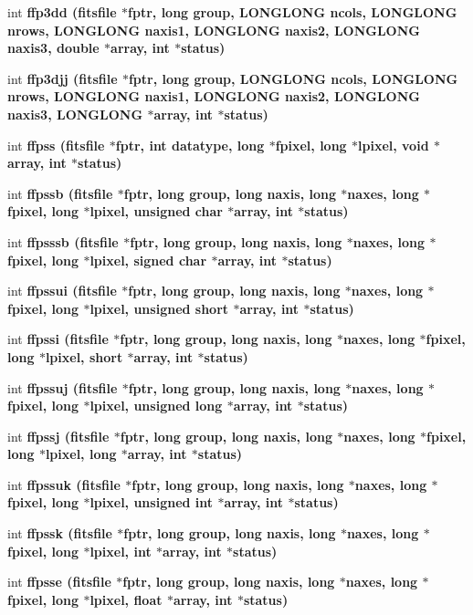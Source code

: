 \begin{CompactItemize}
\item 
int \bf{ffp3dd} (\bf{fitsfile} $\ast$fptr, long group, \bf{LONGLONG} ncols, \bf{LONGLONG} nrows, \bf{LONGLONG} naxis1, \bf{LONGLONG} naxis2, \bf{LONGLONG} naxis3, double $\ast$array, int $\ast$status)
\item 
int \bf{ffp3djj} (\bf{fitsfile} $\ast$fptr, long group, \bf{LONGLONG} ncols, \bf{LONGLONG} nrows, \bf{LONGLONG} naxis1, \bf{LONGLONG} naxis2, \bf{LONGLONG} naxis3, \bf{LONGLONG} $\ast$array, int $\ast$status)
\item 
int \bf{ffpss} (\bf{fitsfile} $\ast$fptr, int \bf{datatype}, long $\ast$fpixel, long $\ast$lpixel, void $\ast$array, int $\ast$status)
\item 
int \bf{ffpssb} (\bf{fitsfile} $\ast$fptr, long group, long naxis, long $\ast$naxes, long $\ast$fpixel, long $\ast$lpixel, unsigned char $\ast$array, int $\ast$status)
\item 
int \bf{ffpsssb} (\bf{fitsfile} $\ast$fptr, long group, long naxis, long $\ast$naxes, long $\ast$fpixel, long $\ast$lpixel, signed char $\ast$array, int $\ast$status)
\item 
int \bf{ffpssui} (\bf{fitsfile} $\ast$fptr, long group, long naxis, long $\ast$naxes, long $\ast$fpixel, long $\ast$lpixel, unsigned short $\ast$array, int $\ast$status)
\item 
int \bf{ffpssi} (\bf{fitsfile} $\ast$fptr, long group, long naxis, long $\ast$naxes, long $\ast$fpixel, long $\ast$lpixel, short $\ast$array, int $\ast$status)
\item 
int \bf{ffpssuj} (\bf{fitsfile} $\ast$fptr, long group, long naxis, long $\ast$naxes, long $\ast$fpixel, long $\ast$lpixel, unsigned long $\ast$array, int $\ast$status)
\item 
int \bf{ffpssj} (\bf{fitsfile} $\ast$fptr, long group, long naxis, long $\ast$naxes, long $\ast$fpixel, long $\ast$lpixel, long $\ast$array, int $\ast$status)
\item 
int \bf{ffpssuk} (\bf{fitsfile} $\ast$fptr, long group, long naxis, long $\ast$naxes, long $\ast$fpixel, long $\ast$lpixel, unsigned int $\ast$array, int $\ast$status)
\item 
int \bf{ffpssk} (\bf{fitsfile} $\ast$fptr, long group, long naxis, long $\ast$naxes, long $\ast$fpixel, long $\ast$lpixel, int $\ast$array, int $\ast$status)
\item 
int \bf{ffpsse} (\bf{fitsfile} $\ast$fptr, long group, long naxis, long $\ast$naxes, long $\ast$fpixel, long $\ast$lpixel, float $\ast$array, int $\ast$status)
\item 

\end{CompactItemize}
